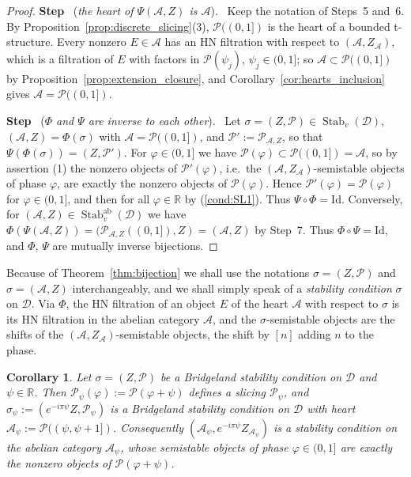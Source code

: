 \documentclass[12pt]{amsart}
\newcommand{\condref}[1]{\textup{(\ref{#1})}}
\newtheorem{corollary}[theorem]{Corollary}
\numberwithin{theorem}{section}
\theoremstyle{definition}
\newcounter{pstep}
\newcommand{\step}[1]{\par\medskip\noindent\refstepcounter{pstep}\textbf{Step \thepstep}\ (\textit{#1}).\ \ignorespaces}
\newcommand{\RR}{\mathbb{R}}
\newcommand{\calA}{\mathcal{A}}
\newcommand{\calP}{\mathcal{P}}
\newcommand{\id}{\mathrm{Id}}
\newcommand{\calD}{\mathcal{D}}
\begin{document}
\begin{proof}
		\step{the heart of $\Psi(\calA, Z)$ is $\calA$}
		Keep the notation of Steps~5 and~6.
		By Proposition~\ref{prop:discrete_slicing}(3), $\calP((0, 1])$ is the heart of a bounded t-structure.
		Every nonzero $E \in \calA$ has an HN filtration with respect to $(\calA, Z_{\calA})$, which is a filtration of $E$ with factors in $\calP(\psi_j)$, $\psi_j \in (0, 1]$;
		so $\calA \subset \calP((0, 1])$ by Proposition~\ref{prop:extension_closure}, and Corollary~\ref{cor:hearts_inclusion} gives $\calA = \calP((0, 1])$.

		\step{$\Phi$ and $\Psi$ are inverse to each other}
		Let $\sigma = (Z, \calP) \in \operatorname{Stab}_v(\calD)$, $(\calA, Z) = \Phi(\sigma)$ with $\calA = \calP((0, 1])$, and $\calP' := \calP_{\calA, Z}$, so that $\Psi(\Phi(\sigma)) = (Z, \calP')$.
		For $\varphi \in (0, 1]$ we have $\calP(\varphi) \subset \calP((0, 1]) = \calA$, so by assertion (1) the nonzero objects of $\calP'(\varphi)$, i.e.\ the $(\calA, Z_{\calA})$-semistable objects of phase $\varphi$, are exactly the nonzero objects of $\calP(\varphi)$.
		Hence $\calP'(\varphi) = \calP(\varphi)$ for $\varphi \in (0, 1]$, and then for all $\varphi \in \RR$ by \condref{cond:SL1}.
		Thus $\Psi \circ \Phi = \id$.
		Conversely, for $(\calA, Z) \in \operatorname{Stab}^{\mathrm{ab}}_v(\calD)$ we have $\Phi(\Psi(\calA, Z)) = (\calP_{\calA, Z}((0, 1]), Z) = (\calA, Z)$ by Step~7.
		Thus $\Phi \circ \Psi = \id$, and $\Phi$, $\Psi$ are mutually inverse bijections.
	\end{proof}

	Because of Theorem~\ref{thm:bijection} we shall use the notations $\sigma = (Z, \calP)$ and $\sigma = (\calA, Z)$ interchangeably, and we shall simply speak of a \emph{stability condition} $\sigma$ on $\calD$.
	Via $\Phi$, the HN filtration of an object $E$ of the heart $\calA$ with respect to $\sigma$ is its HN filtration in the abelian category $\calA$, and the $\sigma$-semistable objects are the shifts of the $(\calA, Z_{\calA})$-semistable objects, the shift by $[n]$ adding $n$ to the phase.

	\begin{corollary}
		\label{cor:rotated_heart}
		Let $\sigma = (Z, \calP)$ be a Bridgeland stability condition on $\calD$ and $\psi \in \RR$.
		Then $\calP_{\psi}(\varphi) := \calP(\varphi + \psi)$ defines a slicing $\calP_{\psi}$, and $\sigma_{\psi} := (e^{-i \pi \psi} Z, \calP_{\psi})$ is a Bridgeland stability condition on $\calD$ with heart $\calA_{\psi} := \calP((\psi, \psi + 1])$.
		Consequently $(\calA_{\psi}, e^{-i \pi \psi} Z_{\calA_{\psi}})$ is a stability condition on the abelian category $\calA_{\psi}$, whose semistable objects of phase $\varphi \in (0, 1]$ are exactly the nonzero objects of $\calP(\varphi + \psi)$.
	\end{corollary}
\end{document}
